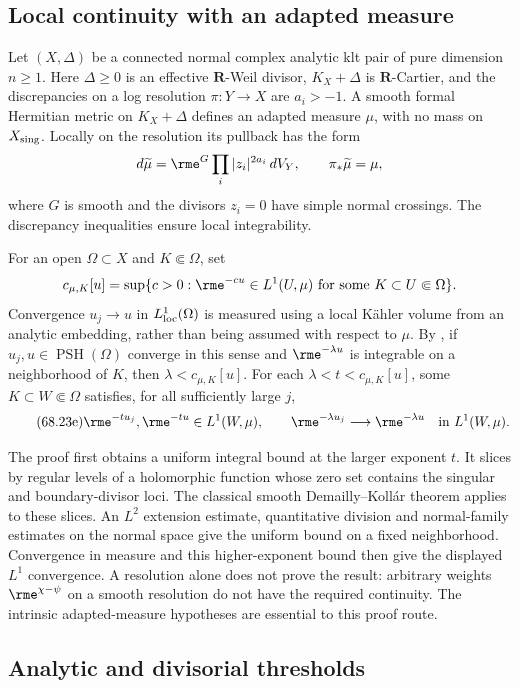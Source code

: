 \subsection{Local continuity with an adapted measure}

Let $(X,\Delta)$ be a connected normal complex analytic klt pair
of pure dimension $n\geq1$. Here $\Delta\geq0$ is an effective
$\mathbf R$-Weil divisor, $K_X+\Delta$ is $\mathbf R$-Cartier,
and the discrepancies on a log resolution $\pi:Y\to X$ are
$a_i>-1$. A smooth formal Hermitian metric on $K_X+\Delta$
defines an adapted measure $\mu$, with no mass on $X_{\rm sing}$.
Locally on the resolution its pullback has the form
\[
 d\widetilde\mu=\rme^G\prod_i|z_i|^{2a_i}\,dV_Y,
 \qquad \pi_*\widetilde\mu=\mu,
\]
where $G$ is smooth and the divisors $z_i=0$ have simple normal
crossings. The discrepancy inequalities ensure local integrability.

For an open $\Omega\subset X$ and $K\Subset\Omega$, set
\[
 c_{\mu,K}[u]=\sup\{c>0:\rme^{-cu}\in L^1(U,\mu)
       \text{ for some }K\subset U\Subset\Omega\}.
\]
Convergence $u_j\to u$ in $L^1_{\rm loc}(\Omega)$ is measured
using a local K\"ahler volume from an analytic embedding, rather
than being assumed with respect to $\mu$.
By \cite[Theorem~1.1]{DarvasZhang26KltV2}, if
$u_j,u\in\operatorname{PSH}(\Omega)$ converge in this sense and
$\rme^{-\lambda u}$ is integrable on a neighborhood of $K$, then
$\lambda<c_{\mu,K}[u]$. For each
$\lambda<t<c_{\mu,K}[u]$, some $K\subset W\Subset\Omega$
satisfies, for all sufficiently large $j$,
\[
\tag{68.23e}\label{eq:ytd-klt-exponential-continuity}
 \rme^{-tu_j},\rme^{-tu}\in L^1(W,\mu),
 \qquad \rme^{-\lambda u_j}\longrightarrow\rme^{-\lambda u}
           \quad\text{in }L^1(W,\mu).
\]

The proof first obtains a uniform integral bound at the larger
exponent $t$. It slices by regular levels of a holomorphic
function whose zero set contains the singular and boundary-divisor
loci. The classical smooth Demailly--Koll\'ar theorem applies to
these slices. An $L^2$ extension estimate, quantitative division
and normal-family estimates on the normal space give the uniform
bound on a fixed neighborhood. Convergence in measure and this
higher-exponent bound then give the displayed $L^1$ convergence.
A resolution alone does not prove the result: arbitrary weights
$\rme^{\chi-\psi}$ on a smooth resolution do not have the required
continuity. The intrinsic adapted-measure hypotheses are essential
to this proof route.

\subsection{Analytic and divisorial thresholds}

